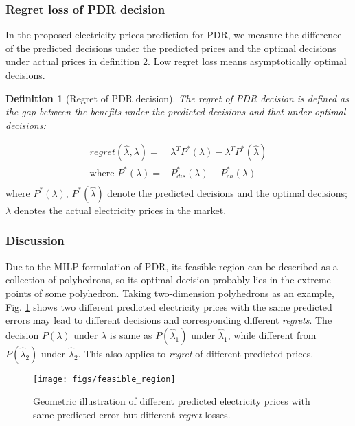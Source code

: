 \documentclass[journal]{IEEEtran}
\newtheorem{definition}{Definition}
\begin{document}
\subsubsection{Regret loss of PDR decision}
In the proposed electricity prices prediction for PDR, we measure the difference of the predicted decisions under the predicted prices and the optimal decisions under actual prices in definition 2. Low regret loss means asymptotically optimal decisions.
\begin{definition}[Regret of PDR decision]
The regret of PDR decision is defined as the gap between the benefits under the predicted decisions and that under optimal decisions:  
\end{definition}
\begin{equation}
  \label{gradientsofregret}
  \begin{aligned}
    regret(\hat{\lambda}, \lambda) = & \lambda^T P^*(\lambda) - \lambda^T P^*(\hat{\lambda}) \\
    \text{where } P^*(\lambda) = & P_{dis}^*(\lambda) - P_{ch}^*(\lambda)  \\
  \end{aligned}
\end{equation}
where $ P^*(\lambda)$, $ P^*(\hat{\lambda})$ denote the predicted decisions and the optimal decisions; $\lambda$ denotes the actual electricity prices in the market.

\subsubsection{Discussion}
Due to the MILP formulation of PDR, its feasible region can be described as a collection of polyhedrons, so its optimal decision probably lies in the extreme points of some polyhedron. Taking two-dimension polyhedrons as an example, Fig. \ref{Feasible} shows two different predicted electricity prices with the same predicted errors may lead to different decisions and corresponding different \textit{regrets}. The decision $P(\lambda)$ under $\lambda$ is same as $P(\hat{\lambda}_1)$ under $\hat{\lambda}_1$, while different from $P(\hat{\lambda}_2)$ under $\hat{\lambda}_2$. This also applies to \textit{regret} of different predicted prices. 
\begin{figure}[ht]
  \centering
  \texttt{[image: figs/feasible\_region]}
  \caption{Geometric illustration of different predicted electricity prices with same predicted error but different \textit{regret} losses.}
  \label{Feasible}
\end{figure}
\end{document}
